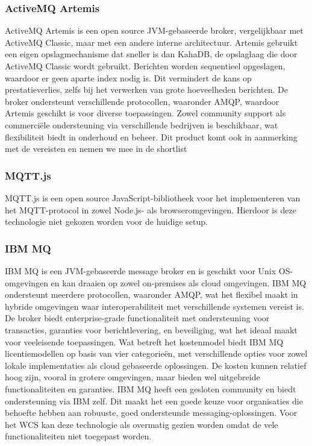 \subsubsection{ActiveMQ Artemis}
ActiveMQ Artemis is een open source JVM-gebaseerde broker, vergelijkbaar met ActiveMQ Classic, maar met een andere interne architectuur.
Artemis gebruikt een eigen opslagmechanisme dat sneller is dan KahaDB, de opslaglaag die door ActiveMQ Classic wordt gebruikt.
Berichten worden sequentieel opgeslagen, waardoor er geen aparte index nodig is.
Dit vermindert de kans op prestatieverlies, zelfs bij het verwerken van grote hoeveelheden berichten.
De broker ondersteunt verschillende protocollen, waaronder AMQP, waardoor Artemis geschikt is voor diverse toepassingen.
Zowel community support als commerciële ondersteuning via verschillende bedrijven is beschikbaar, 
wat flexibiliteit biedt in onderhoud en beheer.
Dit product komt ook in aanmerking met de vereisten en nemen we mee in de shortlist

\subsubsection{MQTT.js}
MQTT.js is een open source JavaScript-bibliotheek voor het implementeren van het MQTT-protocol in zowel Node.js- als browseromgevingen.
Hierdoor is deze technologie niet gekozen worden voor de huidige setup.

\subsubsection{IBM MQ}
IBM MQ is een JVM-gebaseerde message broker en is geschikt voor Unix OS-omgevingen en kan draaien op zowel on-premises als cloud omgevingen.
IBM MQ ondersteunt meerdere protocollen, waaronder AMQP, wat het flexibel maakt in hybride omgevingen waar interoperabiliteit met verschillende systemen vereist is.
De broker biedt enterprise-grade functionaliteit met ondersteuning voor transacties, garanties voor berichtlevering, en beveiliging, wat het ideaal maakt voor veeleisende toepassingen.
Wat betreft het kostenmodel biedt IBM MQ licentiemodellen op basis van vier categorieën, 
met verschillende opties voor zowel lokale implementaties als cloud gebaseerde oplossingen.
De kosten kunnen relatief hoog zijn, vooral in grotere omgevingen, maar bieden wel uitgebreide functionaliteiten en garanties.
IBM MQ heeft een gesloten community en biedt ondersteuning via IBM zelf. 
Dit maakt het een goede keuze voor organisaties die behoefte hebben aan robuuste, goed ondersteunde messaging-oplossingen.
Voor het WCS kan deze technologie als overmatig gezien worden omdat de vele functionaliteiten niet toegepast worden.

